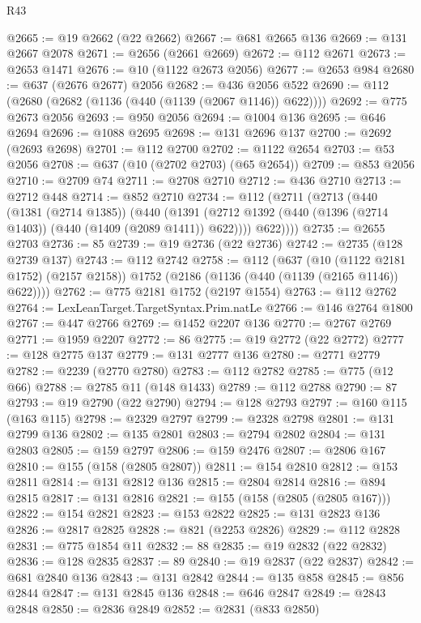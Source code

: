 \begin{lexlean}{R43}
\begin{coremodule}
@2665 := @19 @2662 (@22 @2662)
@2667 := @681 @2665 @136
@2669 := @131 @2667 @2078
@2671 := @2656 (@2661 @2669)
@2672 := @112 @2671
@2673 := @2653 @1471
@2676 := @10 (@1122 @2673 @2056)
@2677 := @2653 @984
@2680 := @637 (@2676 @2677) @2056
@2682 := @436 @2056 @522
@2690 := @112 (@2680 (@2682 (@1136 (@440 (@1139 (@2067 @1146)) @622))))
@2692 := @775 @2673 @2056
@2693 := @950 @2056
@2694 := @1004 @136
@2695 := @646 @2694
@2696 := @1088 @2695
@2698 := @131 @2696 @137
@2700 := @2692 (@2693 @2698)
@2701 := @112 @2700
@2702 := @1122 @2654
@2703 := @53 @2056
@2708 := @637 (@10 (@2702 @2703) (@65 @2654))
@2709 := @853 @2056
@2710 := @2709 @74
@2711 := @2708 @2710
@2712 := @436 @2710
@2713 := @2712 @448
@2714 := @852 @2710
@2734 := @112
    (@2711
      (@2713
        (@440
          (@1381 (@2714 @1385))
          (@440
            (@1391 (@2712 @1392 (@440 (@1396 (@2714 @1403)) (@440 (@1409 (@2089 @1411)) @622))))
            @622))))
@2735 := @2655 @2703
@2736 := 85
@2739 := @19 @2736 (@22 @2736)
@2742 := @2735 (@128 @2739 @137)
@2743 := @112 @2742
@2758 := @112
    (@637
      (@10 (@1122 @2181 @1752) (@2157 @2158))
      @1752
      (@2186 (@1136 (@440 (@1139 (@2165 @1146)) @622))))
@2762 := @775 @2181 @1752 (@2197 @1554)
@2763 := @112 @2762
@2764 := LexLeanTarget.TargetSyntax.Prim.natLe
@2766 := @146 @2764 @1800
@2767 := @447 @2766
@2769 := @1452 @2207 @136
@2770 := @2767 @2769
@2771 := @1959 @2207
@2772 := 86
@2775 := @19 @2772 (@22 @2772)
@2777 := @128 @2775 @137
@2779 := @131 @2777 @136
@2780 := @2771 @2779
@2782 := @2239 (@2770 @2780)
@2783 := @112 @2782
@2785 := @775 (@12 @66)
@2788 := @2785 @11 (@148 @1433)
@2789 := @112 @2788
@2790 := 87
@2793 := @19 @2790 (@22 @2790)
@2794 := @128 @2793
@2797 := @160 @115 (@163 @115)
@2798 := @2329 @2797
@2799 := @2328 @2798
@2801 := @131 @2799 @136
@2802 := @135 @2801
@2803 := @2794 @2802
@2804 := @131 @2803
@2805 := @159 @2797
@2806 := @159 @2476
@2807 := @2806 @167
@2810 := @155 (@158 (@2805 @2807))
@2811 := @154 @2810
@2812 := @153 @2811
@2814 := @131 @2812 @136
@2815 := @2804 @2814
@2816 := @894 @2815
@2817 := @131 @2816
@2821 := @155 (@158 (@2805 (@2805 @167)))
@2822 := @154 @2821
@2823 := @153 @2822
@2825 := @131 @2823 @136
@2826 := @2817 @2825
@2828 := @821 (@2253 @2826)
@2829 := @112 @2828
@2831 := @775 @1854 @11
@2832 := 88
@2835 := @19 @2832 (@22 @2832)
@2836 := @128 @2835
@2837 := 89
@2840 := @19 @2837 (@22 @2837)
@2842 := @681 @2840 @136
@2843 := @131 @2842
@2844 := @135 @858
@2845 := @856 @2844
@2847 := @131 @2845 @136
@2848 := @646 @2847
@2849 := @2843 @2848
@2850 := @2836 @2849
@2852 := @2831 (@833 @2850)

\end{coremodule}
\end{lexlean}
